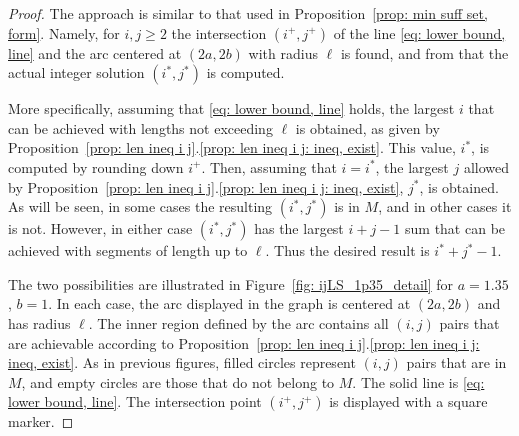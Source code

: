 \documentclass[12pt, a4paper]{article}
\newcommand{\len}{\ell} %
\newcommand{\isolr}{i^+}
\newcommand{\jsolr}{j^+}
\newcommand{\isoli}{i^\ast}
\newcommand{\jsoli}{j^\ast}
\newcommand{\mss}{M}
\begin{document}
\begin{proof}
The approach is similar to that used in Proposition~\ref{prop: min suff set, form}. Namely, for $i, j \geq 2$ the intersection $(\isolr, \jsolr)$ of the line \eqref{eq: lower bound, line} and the arc centered at $(2a,2b)$ with radius $\len$ is found, and from that the actual integer solution $(\isoli, \jsoli)$ is computed.

More specifically, assuming that \eqref{eq: lower bound, line} holds, the largest $i$ that can be achieved with lengths not exceeding $\len$ is obtained, as given by Proposition~\ref{prop: len ineq i j}.\ref{prop: len ineq i j: ineq, exist}. This value, $\isoli$, is computed by rounding down $\isolr$. Then, assuming that $i = \isoli$, the largest $j$ allowed by Proposition~\ref{prop: len ineq i j}.\ref{prop: len ineq i j: ineq, exist}, $\jsoli$, is obtained. As will be seen, in some cases the resulting $(\isoli,\jsoli)$ is in $\mss$, and in other cases it is not. However, in either case $(\isoli,\jsoli)$ has the largest $i+j-1$ sum that can be achieved with segments of length up to $\len$. Thus the desired result is $\isoli+\jsoli-1$.

The two possibilities are illustrated in Figure~\ref{fig: ijLS_1p35_detail} for $a=1.35$, $b=1$. In each case, the arc displayed in the graph is centered at $(2a,2b)$ and has radius $\len$. The inner region defined by the arc contains all $(i,j)$ pairs that are achievable according to Proposition~\ref{prop: len ineq i j}.\ref{prop: len ineq i j: ineq, exist}. As in previous figures, filled circles represent $(i,j)$ pairs that are in $\mss$, and empty circles are those that do not belong to $\mss$. The solid line is \eqref{eq: lower bound, line}. The intersection point $(\isolr, \jsolr)$ is displayed with a square marker.


\end{proof}
\end{document}
